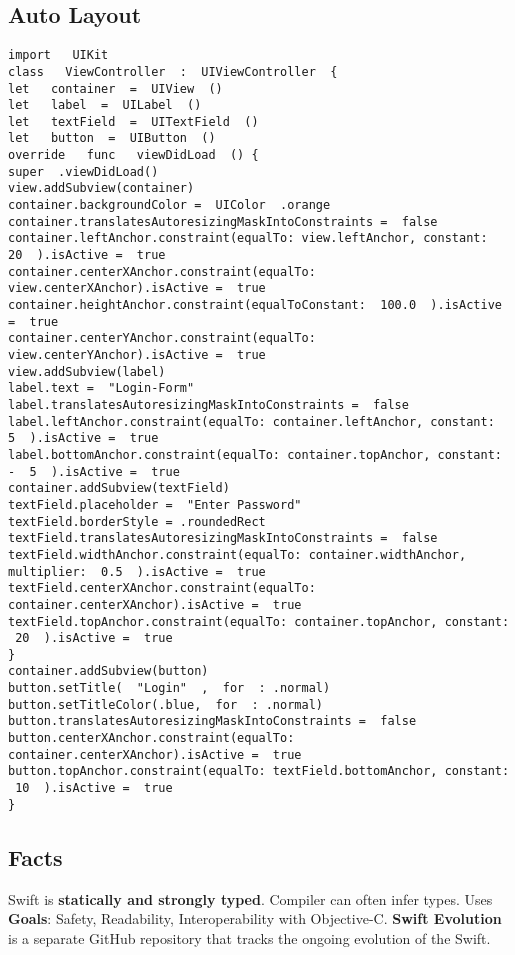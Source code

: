 \subsection{Auto Layout}
\begin{lstlisting}
import ​ ​ UIKit
class ​ ​ ViewController ​ : ​ UIViewController ​ {
let ​ ​ container ​ = ​ UIView ​ ()
let ​ ​ label ​ = ​ UILabel ​ ()
let ​ ​ textField ​ = ​ UITextField ​ ()
let ​ ​ button ​ = ​ UIButton ​ ()
override ​ ​ func ​ ​ viewDidLoad ​ () {
super ​ .viewDidLoad()
view.addSubview(container)
container.backgroundColor = ​ UIColor ​ .orange
container.translatesAutoresizingMaskIntoConstraints = ​ false
container.leftAnchor.constraint(equalTo: view.leftAnchor, constant: ​ 20 ​ ).isActive = ​ true
container.centerXAnchor.constraint(equalTo: view.centerXAnchor).isActive = ​ true
container.heightAnchor.constraint(equalToConstant: ​ 100.0 ​ ).isActive = ​ true
container.centerYAnchor.constraint(equalTo: view.centerYAnchor).isActive = ​ true
view.addSubview(label)
label.text = ​ "Login-Form"
label.translatesAutoresizingMaskIntoConstraints = ​ false
label.leftAnchor.constraint(equalTo: container.leftAnchor, constant: ​ 5 ​ ).isActive = ​ true
label.bottomAnchor.constraint(equalTo: container.topAnchor, constant: ​ - ​ 5 ​ ).isActive = ​ true
container.addSubview(textField)
textField.placeholder = ​ "Enter Password"
textField.borderStyle = .roundedRect
textField.translatesAutoresizingMaskIntoConstraints = ​ false
textField.widthAnchor.constraint(equalTo: container.widthAnchor, multiplier: ​ 0.5 ​ ).isActive = ​ true
textField.centerXAnchor.constraint(equalTo: container.centerXAnchor).isActive = ​ true
textField.topAnchor.constraint(equalTo: container.topAnchor, constant: ​ 20 ​ ).isActive = ​ true
}
container.addSubview(button)
button.setTitle( ​ "Login" ​ , ​ for ​ : .normal)
button.setTitleColor(.blue, ​ for ​ : .normal)
button.translatesAutoresizingMaskIntoConstraints = ​ false
button.centerXAnchor.constraint(equalTo: container.centerXAnchor).isActive = ​ true
button.topAnchor.constraint(equalTo: textField.bottomAnchor, constant: ​ 10 ​ ).isActive = ​ true
}
\end{lstlisting}

\subsection{Facts}
Swift is \textbf{statically and strongly typed}. Compiler can often infer
types. Uses \textbf{Goals}: Safety, Readability, Interoperability with Objective-C.
\textbf{Swift Evolution} is a separate GitHub repository that tracks the
ongoing evolution of the Swift.

